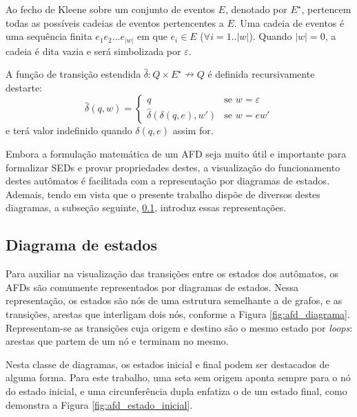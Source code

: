 Ao fecho de Kleene sobre um conjunto de eventos $E$, denotado por $E^\star$, pertencem todas as possíveis cadeias de eventos pertencentes a $E$. Uma cadeia de eventos é uma sequência finita $e_1 e_2 ... e_{|w|}$ em que $e_i \in E$ ($\forall i = 1..|w|$). Quando $|w| = 0$, a cadeia é dita vazia e será simbolizada por $\varepsilon$.

A função de transição estendida $\hat{\delta}:Q \times E^\star \nrightarrow Q$ é definida recursivamente destarte: $$\hat{\delta}(q, w) = \begin{cases}
q & \text{se $w=\varepsilon$} \\
\hat{\delta}(\delta(q, e), w') & \text{se $w=e w'$}
\end{cases}$$ e terá valor indefinido quando $\delta(q, e)$ assim for.

Embora a formulação matemática de um AFD seja muito útil e importante para formalizar SEDs e provar propriedades destes, a visualização do funcionamento destes autômatos é facilitada com a representação por diagramas de estados. Ademais, tendo em vista que o presente trabalho dispõe de diversos destes diagramas, a subseção seguinte, \ref{subsec:diagramas}, introduz essas representações.

\subsection{Diagrama de estados}
\label{subsec:diagramas}

Para auxiliar na visualização das transições entre os estados dos autômatos, os AFDs são comumente representados por diagramas de estados. Nessa representação, os estados são nós de uma estrutura semelhante a de grafos, e as transições, arestas que interligam dois nós, conforme a Figura \ref{fig:afd_diagrama}. Representam-se as transições cuja origem e destino são o mesmo estado por \textit{loops}: arestas que partem de um nó e terminam no mesmo.


Nesta classe de diagramas, os estados inicial e final podem ser destacados de alguma forma. Para este trabalho, uma seta sem origem aponta sempre para o nó do estado inicial, e uma circunferência dupla enfatiza o de um estado final, como demonstra a Figura \ref{fig:afd_estado_inicial}.


